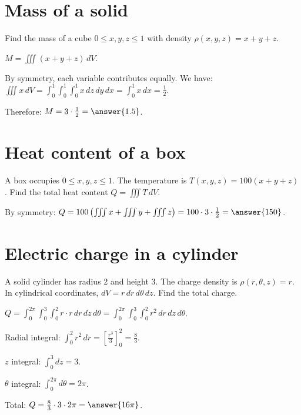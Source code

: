 \documentclass{ximera}
\begin{document}
\section{Mass of a solid}

\begin{problem}
Find the mass of a cube $0\le x,y,z\le 1$ with density $\rho(x,y,z)=x+y+z$.

\begin{solution}
$M=\iiint (x+y+z)\,dV$. 

By symmetry, each variable contributes equally. We have:
$\iiint x\,dV = \int_0^1\int_0^1\int_0^1 x\,dz\,dy\,dx = \int_0^1 x\,dx = \frac{1}{2}$.

Therefore: $M = 3 \cdot \frac{1}{2} = \answer{1.5}$.
\end{solution}
\end{problem}

\section{Heat content of a box}

\begin{problem}
A box occupies $0\leq x,y,z\leq 1$. The temperature is $T(x,y,z)=100(x+y+z)$.
Find the total heat content $Q=\iiint T\,dV$.

\begin{solution}
By symmetry: $Q=100\left(\iiint x + \iiint y + \iiint z\right)=100 \cdot 3 \cdot \frac{1}{2} = \answer{150}$.
\end{solution}
\end{problem}

\section{Electric charge in a cylinder}

\begin{problem}
A solid cylinder has radius 2 and height 3. The charge density is $\rho(r,\theta,z)=r$. In cylindrical coordinates, $dV=r\,dr\,d\theta\,dz$. Find the total charge.

\begin{solution}
$Q=\int_0^{2\pi}\int_0^3\int_0^2 r \cdot r\,dr\,dz\,d\theta = \int_0^{2\pi}\int_0^3\int_0^2 r^2\,dr\,dz\,d\theta$.

Radial integral: $\int_0^2 r^2\,dr = \left[\frac{r^3}{3}\right]_0^2=\frac{8}{3}$.

$z$ integral: $\int_0^3 dz = 3$.

$\theta$ integral: $\int_0^{2\pi} d\theta = 2\pi$.

Total: $Q = \frac{8}{3} \cdot 3 \cdot 2\pi = \answer{16\pi}$.
\end{solution}
\end{problem}
\end{document}
